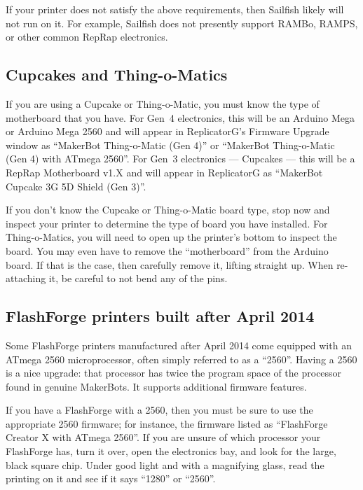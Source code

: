 If your printer does not satisfy the above requirements, then Sailfish
likely will not run on it.  For example, Sailfish does not presently
support RAMBo, RAMPS, or other common RepRap electronics.


\subsection{Cupcakes and Thing-o-Matics}

If you are using a Cupcake or Thing-o-Matic, you must know the type of
motherboard that you have.  For Gen~4 electronics, this will be an Arduino Mega
or Arduino Mega 2560 and will appear in ReplicatorG's Firmware Upgrade
window as ``MakerBot Thing-o-Matic (Gen 4)'' or ``MakerBot Thing-o-Matic
(Gen 4) with ATmega 2560''.  For Gen~3 electronics --- Cupcakes --- this will
be a RepRap Motherboard v1.X and will appear in ReplicatorG as
``MakerBot Cupcake 3G 5D Shield (Gen 3)''.

If you don't know the Cupcake or Thing-o-Matic board type, stop now
and inspect your printer to determine the type of board you have
installed.  For Thing-o-Matics, you will need to open up the printer's
bottom to inspect the board. You may even have to remove the ``motherboard''
from the Arduino board.  If that is the case, then carefully remove it,
lifting straight up.  When re-attaching it, be careful to not bend any
of the pins.


\subsection{FlashForge printers built after April 2014}

Some FlashForge printers manufactured after April 2014 come equipped with
an ATmega 2560 microprocessor, often simply referred to as a ``2560''.  Having
a 2560 is a nice upgrade: that processor has twice the program space of
the processor found in genuine MakerBots. It supports additional firmware
features.

If you have a FlashForge with a 2560, then you must be sure to use the
appropriate 2560 firmware; for instance, the firmware listed as ``FlashForge Creator
X with ATmega 2560''.  If you are unsure of which processor your FlashForge
has, turn it over, open the electronics bay, and look for the large, black
square chip.  Under good light and with a magnifying glass, read the printing
on it and see if it says ``1280'' or ``2560''.

